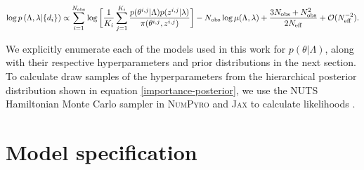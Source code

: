 \begin{equation}\label{importance-posterior}
    \log p\left(\Lambda, \lambda | \{d_i\}\right) \propto \sum_{i=1}^{N_\mathrm{obs}} \log \bigg[ \frac{1}{K_i} \sum_{j=1}^{K_i} \frac{p(\theta^{i,j}|\Lambda)p(z^{i,j}|\lambda)}{\pi(\theta^{i,j}, z^{i,j})} \bigg] -  \\
    N_\mathrm{obs} \log \mu(\Lambda, \lambda) + \frac{3N_\mathrm{obs} + N_\mathrm{obs}^2}{2N_\mathrm{eff}} + \mathcal{O}(N_\mathrm{eff}^{-2}).
\end{equation}

We explicitly enumerate each of the models used in this work for $p(\theta|\Lambda)$, along with 
their respective hyperparameters and prior distributions in the next section. To calculate draw 
samples of the hyperparameters from the hierarchical posterior distribution shown in equation \ref{importance-posterior}, we use the 
NUTS Hamiltonian Monte Carlo sampler in \textsc{NumPyro} and \textsc{Jax} to calculate likelihoods \citep{jax,pyro,numpyro}.

\section{Model specification} \label{sec:modelpriors}

